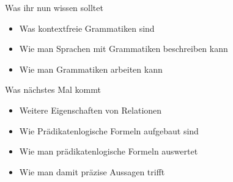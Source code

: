 \begin{frame}	
	\begin{block}{Was ihr nun wissen solltet}
		\begin{itemize}
			\item Was kontextfreie Grammatiken sind
			\item Wie man Sprachen mit Grammatiken beschreiben kann
			\item Wie man Grammatiken arbeiten kann
		\end{itemize}
	\end{block}
	
	\begin{block}{Was nächstes Mal kommt}
		\begin{itemize}
			\item Weitere Eigenschaften von Relationen
			\item Wie Prädikatenlogische Formeln aufgebaut sind
			\item Wie man prädikatenlogische Formeln auswertet
			\item Wie man damit präzise Aussagen trifft
		\end{itemize}
	\end{block}
\end{frame}


\slideThanks

